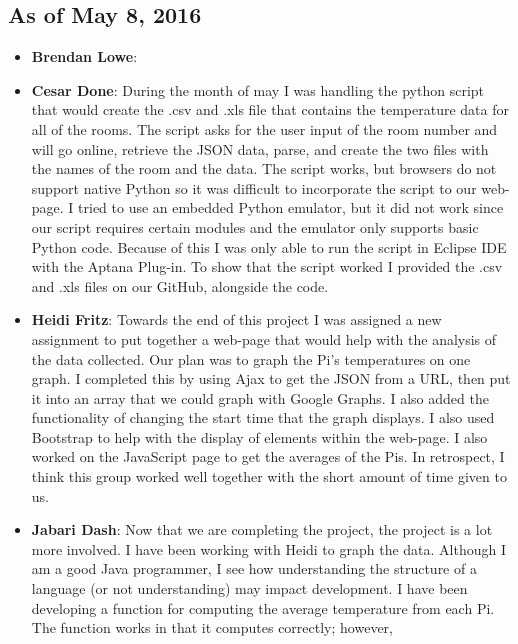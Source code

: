\documentclass{article}
\begin{document}
			\subsection{As of May 8, 2016}
				\begin{itemize}
					\item {\bfseries Brendan Lowe}:
					\item {\bfseries Cesar Done}: During the month of may I was handling the python script that would create the .csv and .xls file that 		 												  contains the temperature data for all of the rooms. The script asks for the user input of the room number 													  and will go online, retrieve the JSON data, parse, and create the two files with the names of the room and 
												  the data. The script works, but browsers do not support native Python so it was difficult to incorporate the
												  script to our web-page. I tried to use an embedded Python emulator, but it did not work since our script 
												  requires certain modules and the emulator only supports basic Python code. Because of this I was only able 
												  to run the script in Eclipse IDE with the Aptana Plug-in. To show that the script worked I provided the .csv 
												  and .xls files on our GitHub, alongside the code.
					\item {\bfseries Heidi Fritz}: Towards the end of this project I was assigned a new assignment to put together a web-page that would help   												   with the 
									   analysis of the data collected.  Our plan was to graph the Pi's temperatures on one graph.  I completed this by using 
									   Ajax to get the JSON from a URL, then put it into an array that we could graph with Google Graphs.  I also added the 
									   functionality of changing the start time that the graph displays.  I also used Bootstrap to help with the display of 
									   elements within the web-page.  I also worked on the JavaScript page to get the averages of the Pis.  In retrospect, I 
									   think this group worked well together with the short amount of time given to us.  
					\item {\bfseries Jabari Dash}: Now that we are completing the project, the project is a lot more involved. I have been working with
												   Heidi to graph the data. Although I am a good Java programmer, I see how understanding the structure
												   of a language (or not understanding) may impact development. I have been developing a function for 
												   computing the average temperature from each Pi. The function works in that it computes correctly; however,

\end{itemize}
\end{document}
